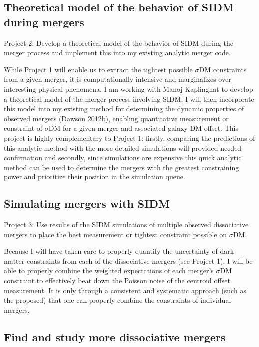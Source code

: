 \subsection{Theoretical model of the behavior of SIDM during mergers}

Project 2: Develop a theoretical model of the behavior of SIDM during the merger process and implement this into my existing analytic merger code. 

While Project 1 will enable us to extract the tightest possible $\sigma$DM  constraints from a given merger, it is computationally intensive and marginalizes over interesting physical phenomena.  I am working with Manoj Kaplinghat to develop a theoretical model of the merger process involving SIDM.  I will then incorporate this model into my existing method for determining the dynamic properties of observed mergers (Dawson 2012b), enabling quantitative measurement or constraint of $\sigma$DM  for a given merger and associated galaxy-DM offset.  This project is highly complementary to Project 1: firstly, comparing the predictions of this analytic method with the more detailed simulations will provided needed confirmation and secondly, since simulations are expensive this quick analytic method can be used to determine the mergers with the greatest constraining power and prioritize their position in the simulation queue.

\subsection{Simulating mergers with SIDM}

Project 3: Use results of the SIDM simulations of multiple observed dissociative mergers to place the best measurement or tightest constraint possible on $\sigma$DM.  

Because I will have taken care to properly quantify the uncertainty of dark matter constraints from each of the dissociative mergers (see Project 1), I will be able to properly combine the weighted expectations of each merger’s $\sigma$DM  constraint to effectively beat down the Poisson noise of the centroid offset measurement.   It is only through a consistent and systematic approach (such as the proposed) that one can properly combine the constraints of individual mergers. 

\subsection{Find and study more dissociative mergers}

